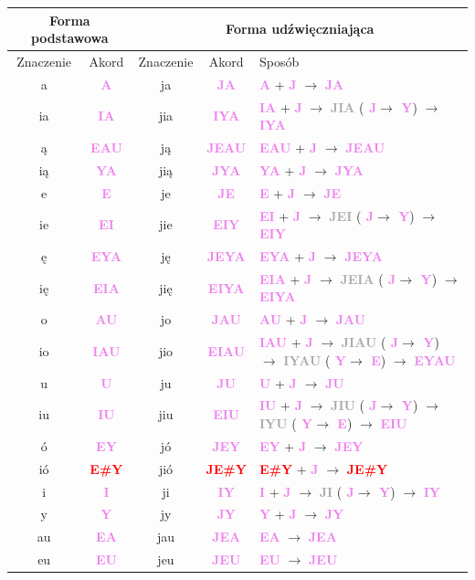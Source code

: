 \documentclass[12p, oneside]{book}
\newcommand{\steno}[1]{\textbf{\textsf{\textcolor{violet}{ #1}}}}
\newcommand{\stenoExc}[1]{\textbf{\textsf{\textcolor{red}{ #1}}}}
\newcommand{\stenoErr}[1]{\textbf{\textsf{\textcolor{darkgray}{ #1}}}}
\begin{document}
\begin{tabular}{| c | c | c | c | p{4.5cm} |}
	\hline
	\multicolumn{2}{|c|}{Forma podstawowa} & \multicolumn{3}{|c|}{Forma
	udźwięczniająca} \\
	\hline
	Znaczenie & Akord & Znaczenie & Akord & Sposób \\ \hline
	a & \steno{A} & ja & \steno{JA} & \steno{A} + \steno{J} $\rightarrow$ \steno{JA} \\ \hline
	ia & \steno{IA} & jia & \steno{IYA} & \steno{IA} + \steno{J} $\rightarrow$ \stenoErr{JIA} (\steno{J}$\rightarrow$\steno{Y}) $\rightarrow$ \steno{IYA} \\ \hline
	ą & \steno{EAU} & ją & \steno{JEAU} & \steno{EAU} + \steno{J} $\rightarrow$ \steno{JEAU} \\ \hline
	ią & \steno{YA} & jią & \steno{JYA} & \steno{YA} + \steno{J} $\rightarrow$ \steno{JYA} \\ \hline
	e & \steno{E} & je & \steno{JE} & \steno{E} + \steno{J} $\rightarrow$ \steno{JE} \\ \hline
	ie & \steno{EI} & jie & \steno{EIY} & \steno{EI} + \steno{J} $\rightarrow$ \stenoErr{JEI} (\steno{J}$\rightarrow$\steno{Y}) $\rightarrow$ \steno{EIY} \\ \hline
	ę & \steno{EYA} & ję & \steno{JEYA} & \steno{EYA} + \steno{J} $\rightarrow$ \steno{JEYA} \\ \hline
	ię & \steno{EIA} & jię & \steno{EIYA} & \steno{EIA} + \steno{J} $\rightarrow$ \stenoErr{JEIA} (\steno{J}$\rightarrow$\steno{Y}) $\rightarrow$ \steno{EIYA} \\ \hline
	o & \steno{AU} & jo & \steno{JAU} & \steno{AU} + \steno{J} $\rightarrow$ \steno{JAU} \\ \hline
	io & \steno{IAU} & jio & \steno{EIAU} & \steno{IAU} + \steno{J} $\rightarrow$ \stenoErr{JIAU} (\steno{J}$\rightarrow$\steno{Y}) $\rightarrow$ \stenoErr{IYAU} (\steno{Y}$\rightarrow$\steno{E}) $\rightarrow$ \steno{EYAU} \\ \hline
	u & \steno{U} & ju & \steno{JU} & \steno{U} + \steno{J} $\rightarrow$ \steno{JU} \\ \hline
	iu & \steno{IU} & jiu & \steno{EIU} & \steno{IU} + \steno{J} $\rightarrow$ \stenoErr{JIU} (\steno{J}$\rightarrow$\steno{Y}) $\rightarrow$ \stenoErr{IYU} (\steno{Y}$\rightarrow$\steno{E}) $\rightarrow$ \steno{EIU} \\ \hline
	ó & \steno{EY} & jó & \steno{JEY} & \steno{EY} + \steno{J} $\rightarrow$ \steno{JEY} \\ \hline
	ió & \stenoExc{E\#Y} & jió & \stenoExc{JE\#Y} & \stenoExc{E\#Y} + \steno{J} $\rightarrow$ \stenoExc{JE\#Y} \\ \hline
	i & \steno{I} & ji & \steno{IY} & \steno{I} + \steno{J} $\rightarrow$ \stenoErr{JI} (\steno{J}$\rightarrow$\steno{Y}) $\rightarrow$ \steno{IY} \\ \hline
	y & \steno{Y} & jy & \steno{JY} & \steno{Y} + \steno{J} $\rightarrow$ \steno{JY} \\ \hline
	au & \steno{EA} & jau & \steno{JEA} & \steno{EA} $\rightarrow$ \steno{JEA} \\ \hline
	eu & \steno{EU} & jeu & \steno{JEU} & \steno{EU} $\rightarrow$ \steno{JEU} \\ \hline
\end{tabular}
\end{document}
